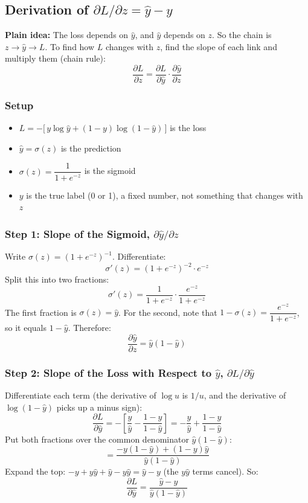 \subsection*{Derivation of $\partial L/\partial z = \hat{y} - y$}

\textbf{Plain idea:} The loss depends on $\hat{y}$, and $\hat{y}$ depends on $z$. So the chain is $z \to \hat{y} \to L$. To find how $L$ changes with $z$, find the slope of each link and multiply them (chain rule):
\[
\frac{\partial L}{\partial z} = \frac{\partial L}{\partial \hat{y}} \cdot \frac{\partial \hat{y}}{\partial z}
\]

\subsubsection*{Setup}

\begin{itemize}
  \item $L = -\big[\, y \log \hat{y} + (1 - y)\log(1 - \hat{y}) \,\big]$ is the loss
  \item $\hat{y} = \sigma(z)$ is the prediction
  \item $\sigma(z) = \dfrac{1}{1 + e^{-z}}$ is the sigmoid
  \item $y$ is the true label (0 or 1), a fixed number, not something that changes with $z$
\end{itemize}

\subsubsection*{Step 1: Slope of the Sigmoid, $\partial \hat{y}/\partial z$}

Write $\sigma(z) = (1 + e^{-z})^{-1}$. Differentiate:
\[
\sigma'(z) = (1 + e^{-z})^{-2}\cdot e^{-z}
\]
Split this into two fractions:
\[
\sigma'(z) = \frac{1}{1 + e^{-z}} \cdot \frac{e^{-z}}{1 + e^{-z}}
\]
The first fraction is $\sigma(z) = \hat{y}$. For the second, note that $1 - \sigma(z) = \dfrac{e^{-z}}{1 + e^{-z}}$, so it equals $1 - \hat{y}$. Therefore:
\[
\frac{\partial \hat{y}}{\partial z} = \hat{y}(1 - \hat{y})
\]

\subsubsection*{Step 2: Slope of the Loss with Respect to $\hat{y}$, $\partial L/\partial \hat{y}$}

Differentiate each term (the derivative of $\log u$ is $1/u$, and the derivative of $\log(1 - \hat{y})$ picks up a minus sign):
\[
\frac{\partial L}{\partial \hat{y}} = -\left[\frac{y}{\hat{y}} - \frac{1 - y}{1 - \hat{y}}\right] = -\frac{y}{\hat{y}} + \frac{1 - y}{1 - \hat{y}}
\]
Put both fractions over the common denominator $\hat{y}(1 - \hat{y})$:
\[
= \frac{-y(1 - \hat{y}) + (1 - y)\hat{y}}{\hat{y}(1 - \hat{y})}
\]
Expand the top: $-y + y\hat{y} + \hat{y} - y\hat{y} = \hat{y} - y$ (the $y\hat{y}$ terms cancel). So:
\[
\frac{\partial L}{\partial \hat{y}} = \frac{\hat{y} - y}{\hat{y}(1 - \hat{y})}
\]

